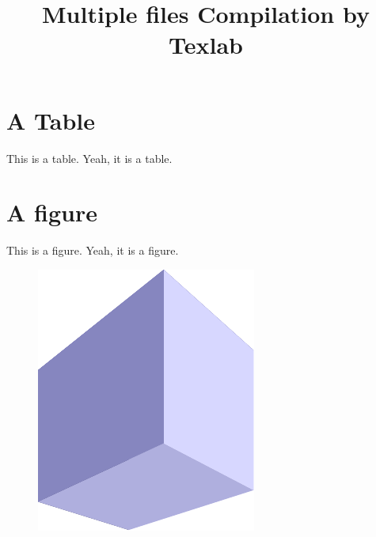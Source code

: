 \documentclass[a4paper,12pt]{article}
\title{Multiple files Compilation by Texlab}
\begin{document}
\maketitle
    \section{A Table}
    This is a table. Yeah, it is a table.
    
    \section{A figure}
    This is a figure. Yeah, it is a figure.
    \begin{figure}
        \centering
        \includegraphics{figure/figure.pdf}
    \end{figure}
\end{document}
